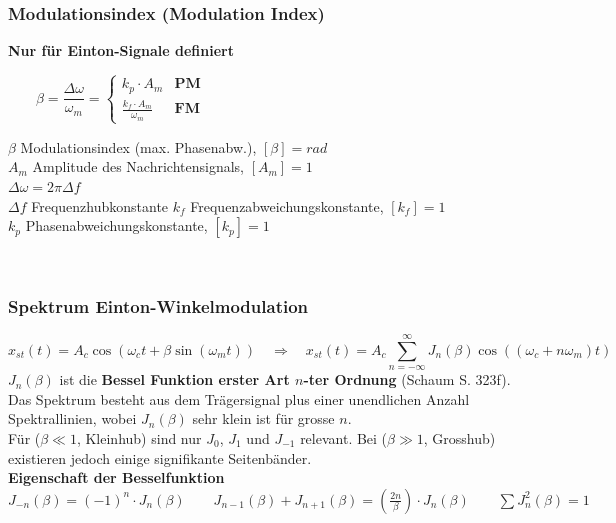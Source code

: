 \subsubsection{Modulationsindex (Modulation Index)}
	\textbf{Nur für Einton-Signale definiert}\\
	\begin{minipage}[t][0.7cm][c]{8cm}
		$ \qquad
		\beta = \dfrac{\Delta \omega}{\omega_m} =
		\begin{cases}
			k_p \cdot A_m & \textbf{PM}  \\
			\frac{k_f \cdot A_m}{\omega_m} & \textbf{FM}
		\end{cases} 
		$
	\end{minipage}
	\begin{minipage}[t][0.7cm][c]{8cm}
		$\beta$ Modulationsindex (max. Phasenabw.), $[\beta] = rad$ \\
		$A_m$ Amplitude des Nachrichtensignals, $[A_m] = 1$ \\
		$\Delta \omega = 2\pi \Delta f$\\
		$\Delta f$ Frequenzhubkonstante
		$k_f$ Frequenzabweichungskonstante, $[k_f] = 1$ \\
		$k_p$ Phasenabweichungskonstante, $[k_p] = 1$
	\end{minipage}\\



\subsubsection{Spektrum Einton-Winkelmodulation}
	\begin{equation*}
		x_{st}(t) = A_c \cos(\omega_c t + \beta \sin(\omega_m t)) \quad \Rightarrow \quad 
			\boxed{	x_{st}(t) = A_c \sum\limits_{n=-\infty}^{\infty} J_n(\beta) \cos((\omega_c + n \omega_m)t)}
	\end{equation*}
	\textbf{$J_n(\beta)$} ist die \textbf{Bessel Funktion erster Art $n$-ter Ordnung} (Schaum
	S. 323f). Das Spektrum besteht aus dem Trägersignal plus einer unendlichen Anzahl Spektrallinien,
	wobei $J_n(\beta)$ sehr klein ist für grosse $n$. \\
	Für ($\beta \ll 1$, Kleinhub) sind nur $J_0$, $J_1$ und $ J_{-1}$ relevant. Bei ($\beta \gg 1$,
	Grosshub) existieren jedoch einige signifikante Seitenbänder.\\
	\textbf{Eigenschaft der Besselfunktion}\\
	$J_{-n}(\beta) = (-1)^n \cdot J_n(\beta) \qquad
	J_{n-1}(\beta) + J_{n+1}(\beta) = (\frac{2n}{\beta})\cdot J_n(\beta) \qquad \sum J_n^2(\beta) = 1$

